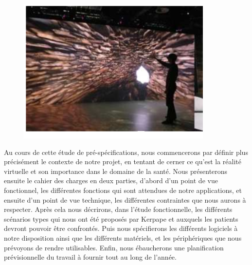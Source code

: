 \begin{figure}
	\centering
	\includegraphics[scale=0.5]{1-PreEtude/img/rv_2.png}
\end{figure}
Au cours de cette étude de pré-spécifications, nous commencerons par définir plus précisément le contexte de notre projet, en tentant de cerner ce qu'est la réalité virtuelle et son importance dans le domaine de la santé. 
Nous présenterons ensuite le cahier des charges en deux parties, d'abord d'un point de vue fonctionnel, les différentes fonctions qui sont attendues de notre applications, et ensuite d'un point de vue technique, les différentes contraintes que nous aurons à respecter. 
Après cela nous décrirons, dans l'étude fonctionnelle, les différents scénarios types qui nous ont été proposés par Kerpape et auxquels les patients devront pouvoir être confrontés. 
Puis nous spécifierons les différents logiciels à notre disposition ainsi que les différents matériels, et les périphériques que nous prévoyons de rendre utilisables. 
Enfin, nous ébaucherons une planification prévisionnelle du travail à fournir tout au long de l'année. 